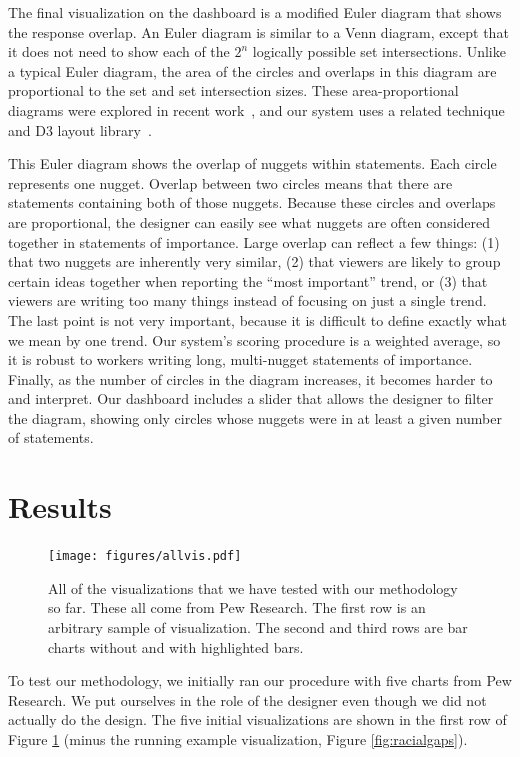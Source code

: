 \documentclass{sigchi}
\begin{document}
The final visualization on the dashboard is a modified Euler diagram
that shows the response overlap. An Euler diagram is similar to a Venn
diagram, except that it does not need to show each of the $2^n$
logically possible set intersections. Unlike a typical Euler diagram,
the area of the circles and overlaps in this diagram are proportional
to the set and set intersection sizes. These area-proportional
diagrams were explored in recent work~\cite{wilkinson2012exact}, and
our system uses a related technique and D3 layout
library~\cite{venn2,venn1,vennlib}.

This Euler diagram shows the overlap of nuggets within statements.
Each circle represents one nugget. Overlap between two circles means
that there are statements containing both of those nuggets. Because
these circles and overlaps are proportional, the designer can easily
see what nuggets are often considered together in statements of
importance. Large overlap can reflect a few things: (1) that two
nuggets are inherently very similar, (2) that viewers are likely to
group certain ideas together when reporting the ``most important''
trend, or (3) that viewers are writing too many things instead of
focusing on just a single trend. The last point is not very important,
because it is difficult to define exactly what we mean by one trend.
Our system's scoring procedure is a weighted average, so it is robust
to workers writing long, multi-nugget statements of importance.
Finally, as the number of circles in the diagram increases, it becomes
harder to and interpret. Our dashboard includes a slider that allows
the designer to filter the diagram, showing only circles whose nuggets
were in at least a given number of statements.

\section{Results}

\begin{figure}[t]
  \begin{center}
    \texttt{[image: figures/allvis.pdf]}
  \end{center}
  \caption{All of the visualizations that we have tested with our methodology so far. These all come from Pew Research. The first row is an arbitrary sample of visualization. The second and third rows are bar charts without and with highlighted bars.}
  \label{fig:allvis}
\end{figure}

To test our methodology, we initially ran our procedure with five
charts from Pew Research. We put ourselves in the role of the designer
even though we did not actually do the design. The five initial
visualizations are shown in the first row of Figure \ref{fig:allvis}
(minus the running example visualization, Figure
\ref{fig:racialgaps}).
\end{document}
